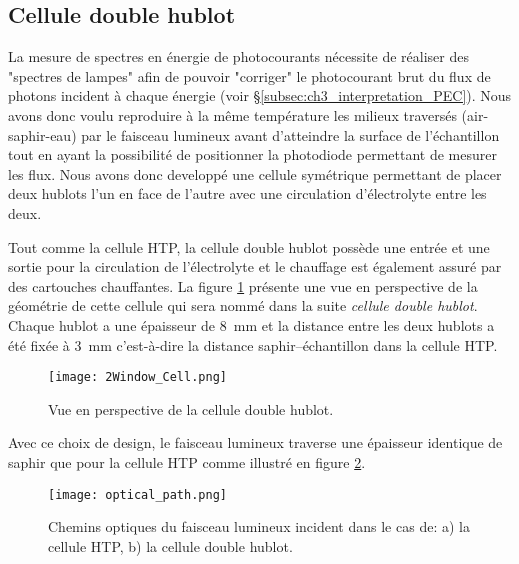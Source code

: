 \begin{refsection}
        

	
\section{Cellule double hublot}\label{sec:2W_cell}

    La mesure de spectres en énergie de photocourants nécessite de réaliser des "spectres de lampes" afin de pouvoir
    "corriger" le
    photocourant brut du flux de photons incident à chaque énergie (voir \S\ref{subsec:ch3_interpretation_PEC}).
    Nous avons donc voulu  reproduire à la même température les milieux traversés (air-saphir-eau)
    par le faisceau lumineux avant d'atteindre la
    surface de l'échantillon tout en ayant la possibilité de positionner la photodiode permettant de mesurer les flux.
    Nous avons donc developpé
    une cellule symétrique permettant de placer deux hublots l'un en face de l'autre avec une circulation d'électrolyte
    entre les deux.

    Tout comme la cellule HTP, la cellule double hublot possède une entrée et une sortie pour la circulation de
    l'électrolyte et le chauffage est également assuré par des cartouches chauffantes.
    La figure \ref{fig:two_window_cell} présente une vue en perspective de la géométrie de cette cellule
    qui sera nommé dans la suite \emph{cellule double hublot}. 
    Chaque hublot a une épaisseur de \SI{8}{\milli\meter} et la distance entre les deux hublots a été fixée à
    \SI{3}{\milli\meter} c'est-à-dire la distance saphir--échantillon dans la cellule HTP.
    
    \begin{figure}[H]
		\centering
		\texttt{[image: 2Window\_Cell.png]}
		\caption{Vue en perspective de la cellule double hublot.}
		\label{fig:two_window_cell}
	\end{figure}
    
    Avec ce choix de design, le faisceau lumineux traverse une épaisseur identique de saphir que pour la cellule HTP
    comme illustré en figure \ref{fig:ch3_optical_paths}.

    \begin{figure}[H]
		\centering
		\texttt{[image: optical\_path.png]}
        \caption
        {Chemins optiques du faisceau lumineux incident dans le cas de: 
        a) la cellule HTP,
        b) la cellule double hublot.}
		\label{fig:ch3_optical_paths}
	\end{figure}


\end{refsection}
